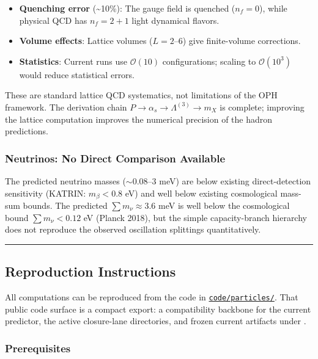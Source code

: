 \begin{itemize}
\tightlist
\item
  \textbf{Quenching error} (\textasciitilde10\%): The gauge field is quenched (\(n_f = 0\)), while physical QCD has \(n_f = 2+1\) light dynamical flavors.
\item
  \textbf{Volume effects}: Lattice volumes (\(L = 2\)--\(6\)) give finite-volume corrections.
\item
  \textbf{Statistics}: Current runs use \(\mathcal{O}(10)\) configurations; scaling to \(\mathcal{O}(10^3)\) would reduce statistical errors.
\end{itemize}

These are standard lattice QCD systematics, not limitations of the OPH framework. The derivation chain \(P \to \alpha_s \to \Lambda^{(3)} \to m_X\) is complete; improving the lattice computation improves the numerical precision of the hadron predictions.

\subsubsection{Neutrinos: No Direct Comparison Available}\label{115-neutrinos-no-direct-comparison-available}

The predicted neutrino masses (\(\sim 0.08\)--\(3\) meV) are below existing direct-detection sensitivity (KATRIN: \(m_\beta < 0.8\) eV) and well below existing cosmological mass-sum bounds. The predicted \(\sum m_\nu \approx 3.6\) meV is well below the cosmological bound \(\sum m_\nu < 0.12\) eV (Planck 2018), but the simple capacity-branch hierarchy does not reproduce the observed oscillation splittings quantitatively.

\begin{center}\rule{0.5\linewidth}{0.5pt}\end{center}

\subsection{Reproduction Instructions}\label{12-reproduction-instructions}

All computations can be reproduced from the code in \href{../code/particles/}{\texttt{code/particles/}}.
That public code surface is a compact export: a
 compatibility backbone for the current predictor,
the active closure-lane directories, and frozen current artifacts under
.

\subsubsection{Prerequisites}\label{121-prerequisites}

